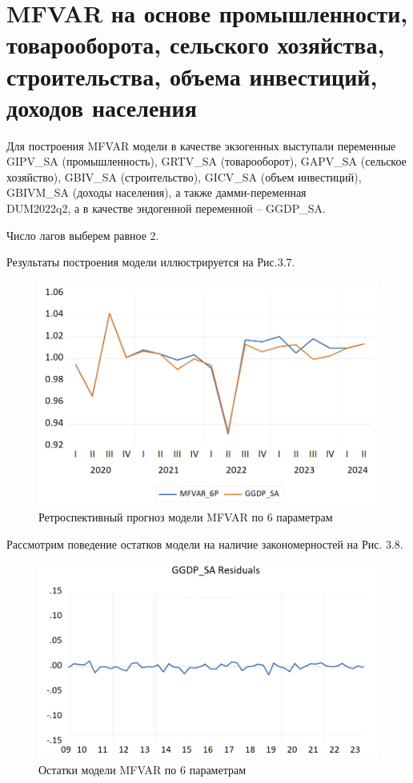 \documentclass[a4paper, 14pt]{extreport}
\numberwithin{equation}{subsection}
\numberwithin{equation}{section}
\begin{document}
	\section{MFVAR на основе промышленности, товарооборота, сельского хозяйства, строительства, объема инвестиций, доходов населения}
	
	Для построения MFVAR модели в качестве экзогенных выступали
	переменные GIPV\_SA (промышленность), GRTV\_SA (товарооборот), GAPV\_SA (сельское хозяйство), GBIV\_SA (строительство), GICV\_SA (объем инвестиций), GBIVM\_SA (доходы населения), а также дамми-переменная\\
	DUM2022q2, а в качестве эндогенной переменной -- GGDP\_SA. 
	
	Число лагов выберем равное 2.
	
	Результаты построения модели
	иллюстрируется на Рис.3.7.
	
	\begin{figure}[h]
		\centering
		\includegraphics[scale=0.5]{images/img21}
		\caption{Ретроспективный прогноз модели MFVAR по 6 параметрам}
		\label{fig:img21}
	\end{figure}
	
	Рассмотрим поведение остатков модели на наличие закономерностей на Рис. 3.8.
	
	\begin{figure}[h!]
		\centering
		\includegraphics[scale=0.5]{images/img22}
		\caption{Остатки модели MFVAR по 6 параметрам}
		\label{fig:img22}
	\end{figure}
	
\end{document}
